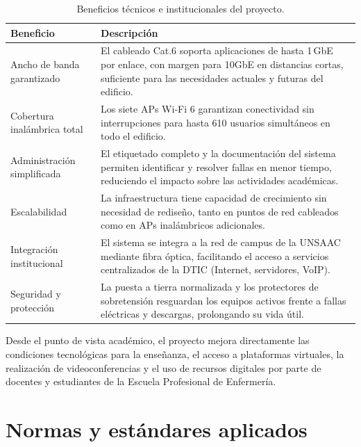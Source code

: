 \begin{table}[H]
    \centering
    \caption{Beneficios técnicos e institucionales del proyecto.}
    \label{tab:beneficios}
    \begin{tabular}{|p{4.5cm}|p{9cm}|}
        \hline
        \textbf{Beneficio} & \textbf{Descripción} \\
        \hline
        Ancho de banda garantizado &
        El cableado Cat.6 soporta aplicaciones de hasta 1\,GbE por enlace,
        con margen para 10GbE en distancias cortas, suficiente para las
        necesidades actuales y futuras del edificio. \\
        \hline
        Cobertura inalámbrica total &
        Los siete APs Wi-Fi 6 garantizan conectividad sin interrupciones
        para hasta 610 usuarios simultáneos en todo el edificio. \\
        \hline
        Administración simplificada &
        El etiquetado completo y la documentación del sistema permiten
        identificar y resolver fallas en menor tiempo, reduciendo el
        impacto sobre las actividades académicas. \\
        \hline
        Escalabilidad &
        La infraestructura tiene capacidad de crecimiento sin necesidad
        de rediseño, tanto en puntos de red cableados como en APs
        inalámbricos adicionales. \\
        \hline
        Integración institucional &
        El sistema se integra a la red de campus de la UNSAAC mediante
        fibra óptica, facilitando el acceso a servicios centralizados
        de la DTIC (Internet, servidores, VoIP). \\
        \hline
        Seguridad y protección &
        La puesta a tierra normalizada y los protectores de sobretensión
        resguardan los equipos activos frente a fallas eléctricas y
        descargas, prolongando su vida útil. \\
        \hline
    \end{tabular}
\end{table}

Desde el punto de vista académico, el proyecto mejora directamente las condiciones
tecnológicas para la enseñanza, el acceso a plataformas virtuales, la realización
de videoconferencias y el uso de recursos digitales por parte de docentes y
estudiantes de la Escuela Profesional de Enfermería.%
\nobreak\vspace{-0.3cm}
\section{Normas y estándares aplicados}
\label{sec:normas}

